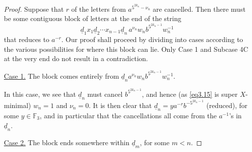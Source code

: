 \documentclass[10pt,a4paper]{amsart}
\newcommand{\F}{\mathbb F}
\newcommand{\pdt}{\underline}
\begin{document}
	\begin{proof}	
		Suppose that $r$ of the letters from $a^{5^{2k_n} - \nu_n}$ are cancelled. Then there must be some contiguous block of letters at the end of the string
		\begin{equation}		\label{eq3.14}
			\pdt{d}_1x_1 \pdt{d}_2 \cdots x_{n-1} \pdt{d}_n \, a^{\nu_n} w_n b^{5^{2k_n-1}} w_n^{-1}
		\end{equation}
		that reduces to $a^{-r}$. Our proof shall proceed by dividing into cases according to the various possibilities for where this block can lie. Only Case 1 and Subcase 4C at the very end do not result in a contradiction.
		
		\vskip 2mm
		\noindent
		\underline{Case 1.} The block comes entirely from $\pdt{d}_n a^{\nu_n} w_n b^{5^{2k_n-1}} w_n^{-1}$.
		
		In this case, we see that $\pdt{d}_n$ must cancel $b^{5^{2k_n-1}}$, and hence (as \eqref{eq3.15} is super $X$-minimal) $w_n=1$ and $\nu_n = 0$. It is then clear that $\pdt{d}_n = y a^{-r}b^{-5^{2k_n-1}}$ (reduced), for some $y \in \F_3$, and  in particular that the cancellations all come from the $a^{-1}$'s in $\pdt{d}_n$.
		
		\vskip 2mm
		\noindent
		\underline{Case 2.} The block ends somewhere within $\pdt{d}_m$, for some $m<n$. 
		
		
		

\end{proof}
\end{document}
